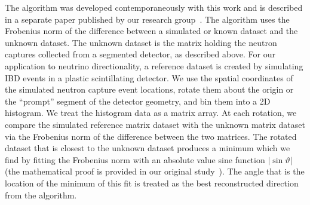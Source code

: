 \documentclass[tightenlines,
twocolumn,prl,notitlepage,nofootinbib,preprintnumbers,longbibliography]{revtex4-1}
\begin{document}
The algorithm was developed contemporaneously with this work and is described in a separate paper published by our research group~\cite{10.1063/5.0315079}. 
The algorithm uses the Frobenius norm of the difference between a simulated or known dataset and the unknown dataset. 
The unknown dataset is the matrix holding the neutron captures collected from a segmented detector, as described above. 
For our application to neutrino directionality, a reference dataset is created by simulating IBD events in a plastic scintillating detector. 
We use the spatial coordinates of the simulated neutron capture event locations, rotate them about the origin or the ``prompt'' segment of the detector geometry, and bin them into a 2D histogram. 
We treat the histogram data as a matrix array. 
At each rotation, we compare the simulated reference matrix dataset with the unknown matrix dataset via the Frobenius norm of the difference between the two matrices. 
The rotated dataset that is closest to the unknown dataset produces a minimum which we find by fitting the Frobenius norm with an absolute value sine function $|\sin \vartheta|$ (the mathematical proof is provided in our original study~\cite{10.1063/5.0315079}).
The angle that is the location of the minimum of this fit is treated as the best reconstructed direction from the algorithm.

\end{document}
